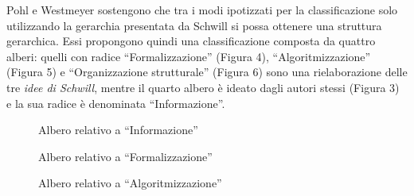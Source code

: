 \documentclass[12pt]{report}
\begin{document}
Pohl e Westmeyer sostengono che tra i modi ipotizzati per la classificazione solo utilizzando la gerarchia presentata da Schwill si possa ottenere una struttura gerarchica.
Essi propongono quindi una classificazione composta da quattro alberi: quelli con radice ``Formalizzazione'' (Figura 4), ``Algoritmizzazione'' (Figura 5) e ``Organizzazione strutturale'' (Figura 6) sono una rielaborazione delle tre \textit{idee di Schwill}, mentre il quarto albero è ideato dagli autori stessi (Figura 3) e la sua radice è denominata ``Informazione''.

\begin{figure}[H]
	\centering
	 \label{Informazione}
	\caption{Albero relativo a ``Informazione'' \cite{PohlLNCS2015}}
\end{figure}

\begin{figure}[H]
	\centering
	 \label{Formalizzazione}
	\caption{Albero relativo a ``Formalizzazione'' \cite{PohlLNCS2015}}
\end{figure}

\begin{figure}[H]
	\centering
	 \label{Algoritmizzazione}
	\caption{Albero relativo a ``Algoritmizzazione'' \cite{PohlLNCS2015}}
\end{figure}
\end{document}
